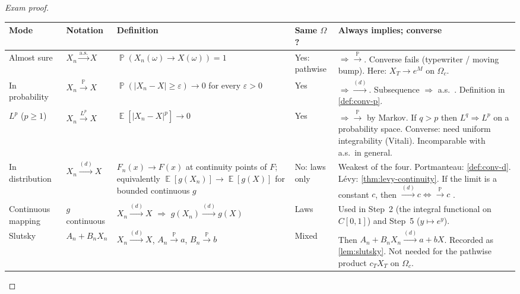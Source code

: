 \documentclass[11pt,a4paper]{article}
\DeclareMathOperator{\E}{\mathbb{E}}
\DeclareMathOperator{\Pbb}{\mathbb{P}}
\begin{document}
\begin{proof}[Exam proof]
\begin{remark}
{\footnotesize
\setlength{\tabcolsep}{3pt}
\renewcommand{\arraystretch}{1.22}
\noindent
\begin{tabularx}{\linewidth}{|
  >{\raggedright\arraybackslash}p{2.05cm}|
  >{\raggedright\arraybackslash}p{2.35cm}|
  >{\raggedright\arraybackslash}X|
  >{\raggedright\arraybackslash}p{2.15cm}|
  >{\raggedright\arraybackslash}X|
}
\hline
\textbf{Mode} & \textbf{Notation} & \textbf{Definition} & \textbf{Same \(\Omega\)?} & \textbf{Always implies; converse} \\
\hline
Almost sure
  & \(X_n\xrightarrow{\mathrm{a.s.}}X\)
  & \(\Pbb(X_n(\omega)\to X(\omega))=1\)
  & Yes: pathwise
  & \(\Rightarrow\xrightarrow{\Pbb}\). Converse fails (typewriter / moving bump). Here: \(X_T\to e^{M}\) on \(\Omega_c\). \\
\hline
In probability
  & \(X_n\xrightarrow{\Pbb}X\)
  & \(\Pbb(|X_n-X|\ge\varepsilon)\to 0\) for every \(\varepsilon>0\)
  & Yes
  & \(\Rightarrow\xrightarrow{(d)}\). Subsequence \(\Rightarrow\) a.s.\ \citep[\S2.3]{durrett2010}. Definition in \cref{def:conv-p}. \\
\hline
\(L^{p}\) (\(p\ge 1\))
  & \(X_n\xrightarrow{L^{p}}X\)
  & \(\E[|X_n-X|^{p}]\to 0\)
  & Yes
  & \(\Rightarrow\xrightarrow{\Pbb}\) by Markov. If \(q>p\) then \(L^{q}\Rightarrow L^{p}\) on a probability space. Converse: need uniform integrability (Vitali). Incomparable with a.s.\ in general. \\
\hline
In distribution
  & \(X_n\xrightarrow{(d)}X\)
  & \(F_n(x)\to F(x)\) at continuity points of \(F\); equivalently \(\E[g(X_n)]\to\E[g(X)]\) for bounded continuous \(g\)
  & No: laws only
  & Weakest of the four. Portmanteau: \cref{def:conv-d}. L\'evy: \cref{thm:levy-continuity}. If the limit is a constant \(c\), then \(\xrightarrow{(d)}c\iff\xrightarrow{\Pbb}c\) \citep[Proposition~9.2.2]{ren2024}. \\
\hline
Continuous mapping
  & \(g\) continuous
  & \(X_n\xrightarrow{(d)}X\) \(\Rightarrow\) \(g(X_n)\xrightarrow{(d)}g(X)\)
  & Laws
  & Used in Step~2 (the integral functional on \(C[0,1]\)) and Step~5 (\(y\mapsto e^{y}\)). \\
\hline
Slutsky
  & \(A_n+B_n X_n\)
  & \(X_n\xrightarrow{(d)}X\), \(A_n\xrightarrow{\Pbb}a\), \(B_n\xrightarrow{\Pbb}b\)
  & Mixed
  & Then \(A_n+B_n X_n\xrightarrow{(d)}a+bX\). Recorded as \cref{lem:slutsky}. Not needed for the pathwise product \(c_T X_T\) on \(\Omega_c\). \\
\hline
\end{tabularx}
}


\end{remark}
\end{proof}
\end{document}
